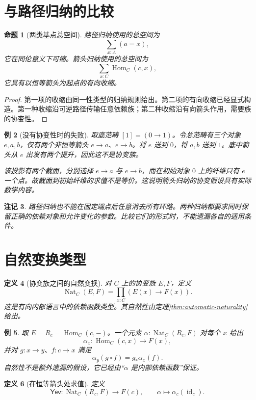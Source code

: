 \documentclass[12pt,oneside,openany,fontset=none]{ctexbook}
\theoremstyle{cn}
\newtheorem{definition}{定义}[chapter]
\newtheorem{example}[definition]{例}
\newtheorem{proposition}[definition]{命题}
\newtheorem{remark}[definition]{注记}
\numberwithin{equation}{chapter}
\newcommand{\id}{\operatorname{id}}
\newcommand{\Hom}{\operatorname{Hom}}
\newcommand{\Nat}{\operatorname{Nat}}
\begin{document}
\section{与路径归纳的比较}
\begin{proposition}[两类基点总空间]
路径归纳使用的总空间为
\[
\sum_{x:A}(a=x),
\]
它在同伦意义下可缩。箭头归纳使用的总空间为
\[
\sum_{x:C}\Hom_C(c,x),
\]
它具有以恒等箭头为起点的有向收缩。
\end{proposition}
\begin{proof}
第一项的收缩由同一性类型的归纳规则给出。第二项的有向收缩已经显式构造。第一种收缩沿可逆路径传输任意依赖族；第二种收缩沿有向箭头作用，需要族的协变性。
\end{proof}
\begin{example}[没有协变性时的失败]
取底范畴 $[1]=(0\to1)$。令总范畴有三个对象 $e,a,b$，仅有两个非恒等箭头 $e\to a$、$e\to b$。将 $e$ 送到 $0$，将 $a,b$ 送到 $1$。底中箭头从 $e$ 出发有两个提升，因此这不是协变族。

该投影有两个截面，分别选择 $e\to a$ 与 $e\to b$，而在初始对象 $0$ 上的纤维只有 $e$ 一个点。故截面到初始纤维的求值不是等价。这说明箭头归纳的协变假设具有实际数学内容。
\end{example}
\begin{remark}
路径归纳也不能在固定端点后任意消去所有环路。两种归纳都要求同时保留正确的依赖对象和允许变化的参数。比较它们的形式时，不能遗漏各自的适用条件。
\end{remark}

\section{自然变换类型}
\begin{definition}[协变族之间的自然变换]
对 $C$ 上的协变族 $E,F$，定义
\[
\Nat_C(E,F)=\prod_{x:C}(E(x)\to F(x)).
\]
这是有向内部语言中的依赖函数类型。其自然性由定理\ref{thm:automatic-naturality}给出。
\end{definition}
\begin{example}
取 $E=R_c=\Hom_C(c,-)$。一个元素 $\alpha:\Nat_C(R_c,F)$ 对每个 $x$ 给出
\[
\alpha_x:\Hom_C(c,x)\to F(x),
\]
并对 $g:x\to y$、$f:c\to x$ 满足
\[
\alpha_y(g\circ f)=g_*\alpha_x(f).
\]
自然性不是额外遗漏的假设，它已经由“$\alpha$ 是内部依赖函数”保证。
\end{example}
\begin{definition}[在恒等箭头处求值]
定义
\[
\mathsf{Yev}:\Nat_C(R_c,F)\to F(c),
\qquad \alpha\longmapsto\alpha_c(\id_c).
\]
\end{definition}
\end{document}

